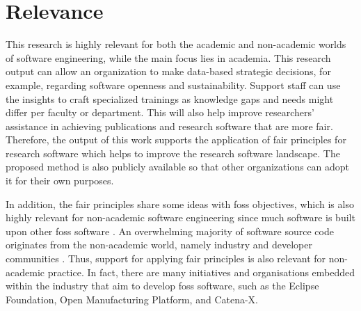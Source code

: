 \section{Relevance}
This research is highly relevant for both the academic and non-academic worlds of software engineering, while the main focus lies in academia. 
This research output can allow an organization to make data-based strategic decisions, for example, regarding software openness and sustainability. Support staff can use the insights to craft specialized trainings as knowledge gaps and needs might differ per faculty or department. This will also help improve researchers' assistance in achieving publications and research software that are more \acrfull{fair}. Therefore, the output of this work supports the application of \acrshort{fair} principles for research software which helps to improve the research software landscape. The proposed method is also publicly available so that other organizations can adopt it for their own purposes.

In addition, the \acrshort{fair} principles share some ideas with \acrfull{foss} objectives, which is also highly relevant for non-academic software engineering since much software is built upon other \acrshort{foss} software \cite{lamprecht_towards_2020}. An overwhelming majority of software source code originates from the non-academic world, namely industry and developer communities \cite{research_data_allianceforce11_software_source_code_identification_wg_use_2020}. Thus, support for applying \acrshort{fair} principles is also relevant for non-academic practice. In fact, there are many initiatives and organisations embedded within the industry that aim to develop \acrshort{foss} software, such as the Eclipse Foundation, Open Manufacturing Platform, and Catena-X. 


